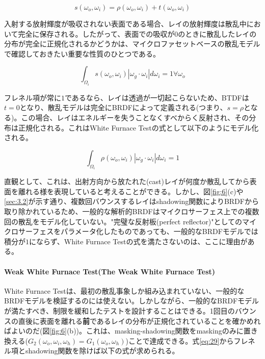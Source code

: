 \documentclass[a4j,xelatex,ja=standard]{bxjsarticle}
\begin{document}
\begin{equation}
    s(\omega_o, \omega_i) = \rho(\omega_o, \omega_i) + t(\omega_o, \omega_i)
    \label{eq:32}
\end{equation}

入射する放射輝度が吸収されない表面である場合、レイの放射輝度は散乱中において完全に保存される。したがって、表面での吸収が$0$のときに散乱したレイの分布が完全に正規化されるかどうかは、マイクロファセットベースの散乱モデルで確認しておきたい重要な性質のひとつである。

\begin{equation}
    \int_{\Omega_i} s(\omega_o, \omega_i) |\omega_g \cdot \omega_i| d\omega_i = 1 \forall \omega_o
    \label{eq:33}
\end{equation}

フレネル項が常に$1$であるなら、レイは透過が一切起こらないため、BTDFは$t = 0$となり、散乱モデルは完全にBRDFによって定義される(つまり、$s = \rho$となる)。この場合、レイはエネルギーを失うことなくすべからく反射され、その分布は正規化される。これはWhite Furnace Testの式として以下のようにモデル化される。

\begin{equation}
    \int_{\Omega_i} \rho(\omega_o, \omega_i) |\omega_g \cdot \omega_i| d\omega_i = 1
    \label{eq:34}
\end{equation}

直観として、これは、出射方向から放たれた(cast)レイが何度か散乱してから表面を離れる様を表現していると考えることができる。しかし、図\ref{fig:6}(c)や\ref{sec:3.2}が示す通り、複数回バウンスするレイはshadowing関数によりBRDFから取り除かれているため、一般的な解析的BRDFはマイクロサーフェス上での複数回の散乱をモデル化していない。"完璧な反射板(perfect reflector)"としてのマイクロサーフェスをパラメータ化したものであっても、一般的なBRDFモデルでは積分が$1$にならず、White Furnace Testの式を満たさないのは、ここに理由がある。

\paragraph{Weak White Furnace Test(The Weak White Furnace Test)}

White Furnace Testは、最初の散乱事象しか組み込まれていない、一般的なBRDFモデルを検証するのには使えない。しかしながら、一般的なBRDFモデルが満たすべき、制限を緩和したテストを設計することはできる。1回目のバウンスの直後に表面を離れる\textbf{前}であるレイの分布が正規化されていることを確かめればよいのだ(図\ref{fig:6}(b))。これは、masking-shadowing関数をmaskingのみに置き換える($G_2(\omega_o, \omega_i, \omega_h) = G_1(\omega_o, \omega_h)$)ことで達成できる。式\eqref{eq:29}からフレネル項とshadowing関数を除けば以下の式が求められる。
\end{document}
